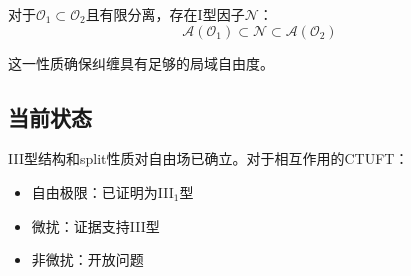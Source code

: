 \begin{conjecture}[Split性质]
对于$\mathcal{O}_1 \subset \mathcal{O}_2$且有限分离，存在I型因子$\mathcal{N}$：
\begin{equation}
    \mathcal{A}(\mathcal{O}_1) \subset \mathcal{N} \subset \mathcal{A}(\mathcal{O}_2)
\end{equation}
\end{conjecture}

这一性质确保纠缠具有足够的局域自由度。

\subsection{当前状态}

III型结构和split性质对自由场已确立。对于相互作用的CTUFT：
\begin{itemize}
    \item 自由极限：已证明为III$_1$型
    \item 微扰：证据支持III型
    \item 非微扰：开放问题
\end{itemize}
